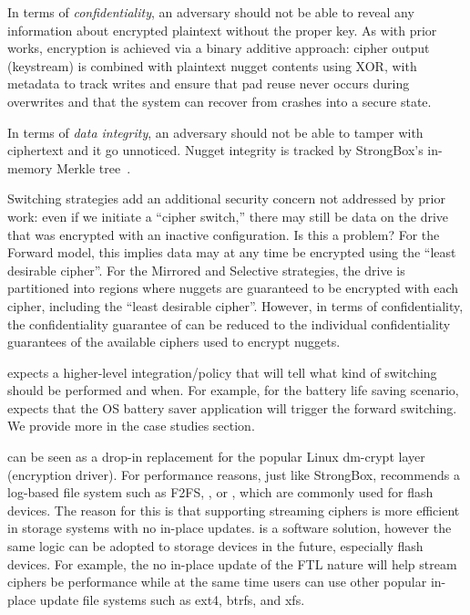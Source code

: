  In terms of {\em confidentiality}, an
adversary should not be able to reveal any information about encrypted plaintext
without the proper key. As with prior works, encryption is achieved via a binary
additive approach: cipher output (keystream) is combined with plaintext nugget
contents using XOR, with metadata to track writes and ensure that pad reuse
never occurs during overwrites and that the system can recover from crashes into
a secure state.

In terms of {\em data integrity}, an adversary should not be able to tamper with
ciphertext and it go unnoticed. Nugget integrity is tracked by StrongBox's
in-memory Merkle tree~\cite{StrongBox}.

Switching strategies add an additional security concern not addressed by prior
work: even if we initiate a ``cipher switch,'' there may still be data on the
drive that was encrypted with an inactive configuration. Is this a problem? For
the Forward model, this implies data may at any time be encrypted using the
``least desirable cipher''. For the Mirrored and Selective strategies, the drive
is partitioned into regions where nuggets are guaranteed to be encrypted with
each cipher, including the ``least desirable cipher''. However, in terms of
confidentiality, the confidentiality guarantee of \sys can be reduced to the
individual confidentiality guarantees of the available ciphers used to encrypt
nuggets. 

 \sys expects a higher-level integration/policy
that will tell \sys what kind of switching should be performed and when. For
example, for the battery life saving scenario, \sys expects that the OS battery
saver application will trigger the forward switching. We provide more in the
case studies section.

 \sys can be seen as a drop-in replacement for the popular
Linux dm-crypt layer (encryption driver). For performance reasons, just like
StrongBox, \sys recommends a log-based file system such as F2FS, \xxx, or \xxx,
which are commonly used for flash devices. The reason for this is that
supporting streaming ciphers is more efficient in storage systems with no
in-place updates. \sys is a software solution, however the same logic can be
adopted to storage devices in the future, especially flash devices. For example,
the no in-place update of the FTL nature will help stream ciphers be performance
while at the same time users can use other popular in-place update file systems
such as ext4, btrfs, and xfs.
